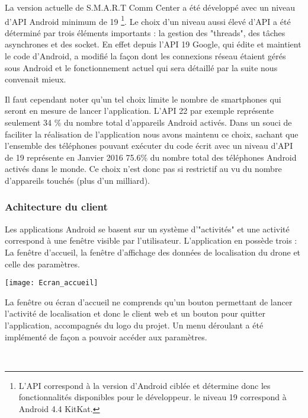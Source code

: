 	La version actuelle de S.M.A.R.T Comm Center a été développé avec un niveau d'API Android minimum de 19 \footnote{L'API correspond à la version d'Android ciblée et détermine donc les fonctionnalités disponibles pour le développeur. le niveau 19 correspond à Android 4.4 KitKat.}. Le choix d'un niveau aussi élevé d'API a été déterminé par trois éléments importants : la gestion des "threads", des tâches asynchrones et des socket. En effet depuis l'API 19 Google, qui édite et maintient le code d'Android, a modifié la façon dont les connexions réseau étaient gérés sous Android et le fonctionnement actuel qui sera détaillé par la suite nous convenait mieux. 
	
	Il faut cependant noter qu'un tel choix limite le nombre de smartphones qui seront en mesure de lancer l'application. L'API 22 par exemple représente seulement 34 \% du nombre total d'appareils Android activés. Dans un souci de faciliter la réalisation de l'application nous avons maintenu ce choix, sachant que l'ensemble des téléphones pouvant exécuter du code écrit avec un niveau d'API de 19 représente en Janvier 2016 75.6\% du nombre total des téléphones Android activés dans le monde. Ce choix n'est donc pas si restrictif au vu du nombre d'appareils touchés (plus d'un milliard).

\subsubsection{Achitecture du client}

	Les applications Android se basent sur un système d'"activités" et une activité correspond à une fenêtre visible par l'utilisateur. L'application en possède trois : La fenêtre d'accueil, la fenêtre d'affichage des données de localisation du drone et celle des paramètres.
	
	\begin{minipage}{0.45\linewidth}
 		\centering
  		\texttt{[image: Ecran\_accueil]}
	\end{minipage}
	\begin{minipage}{0.45\linewidth}

	La fenêtre ou écran d'accueil ne comprends qu'un bouton permettant de lancer l'activité de localisation et donc le client web et un bouton pour quitter l'application, accompagnés du logo du projet. Un menu déroulant a été implémenté de façon a pouvoir accéder aux paramètres.
	\end{minipage}
	~\\	
	
